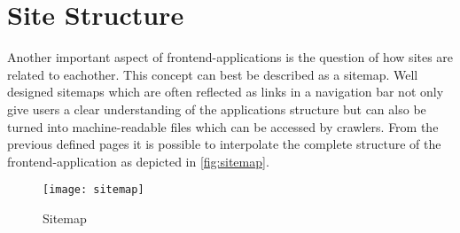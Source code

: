 \section{Site Structure}
Another important aspect of frontend-applications is the question of how sites are related to eachother. This concept can best be described as a sitemap. Well designed sitemaps which are often reflected as links in a navigation bar not only give users a clear understanding of the applications structure but can also be turned into machine-readable files which can be accessed by crawlers. From the previous defined pages it is possible to interpolate the complete structure of the frontend-application as depicted in \autoref{fig:sitemap}. \newline

\begin{figure}[H]
    \begin{center}
    \texttt{[image: sitemap]}
    \end{center}
    \caption{Sitemap}
    \label{fig:sitemap}
\end{figure}